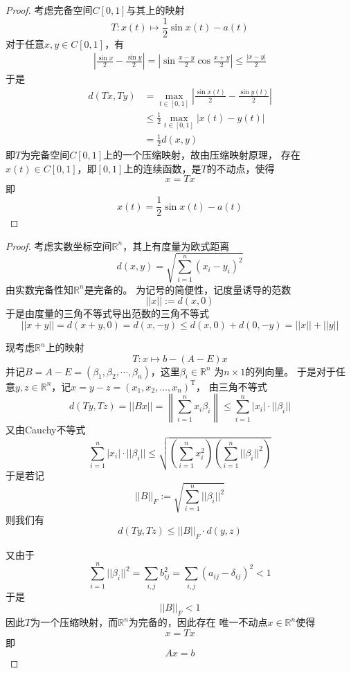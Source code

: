 \documentclass[cn]{homework}
\begin{document}
    \problem
    \begin{proof}
        考虑完备空间$C[0,1]$与其上的映射
        \[T:x(t)\mapsto\frac{1}{2}\sin x(t)-a(t)\]
        对于任意$x,y\in C[0,1]$，有
        \[\begin{aligned}
            \left|\frac{\sin x}{2}-\frac{\sin y}{2}\right|
            =\left|\sin\frac{x-y}{2}\cos\frac{x+y}{2}\right|
            \leq\frac{|x-y|}{2}
        \end{aligned}\]
        于是
        \[\begin{aligned}
        d(Tx,Ty)&=\max_{t\in[0,1]}\left|\frac{\sin x(t)}{2}-\frac{\sin y(t)}{2}\right|\\
        &\leq\frac{1}{2}\max_{t\in[0,1]}|x(t)-y(t)|\\
        &=\frac{1}{2}d(x,y)
        \end{aligned}\]
        即$T$为完备空间$C[0,1]$上的一个压缩映射，故由压缩映射原理，
        存在$x(t)\in C[0,1]$，即$[0,1]$上的连续函数，是$T$的不动点，使得
        \[x=Tx\]
        即
        \[x(t)=\frac{1}{2}\sin x(t)-a(t)\]
    \end{proof}

    \problem
    \begin{proof}
        考虑实数坐标空间$\mathbb R^n$，其上有度量为欧式距离
        \[d(x,y)=\sqrt{\sum_{i=1}^n(x_i-y_i)^2}\]
        由实数完备性知$\mathbb R^n$是完备的。
        为记号的简便性，记度量诱导的范数
        \[||x||:=d(x,0)\]
        于是由度量的三角不等式导出范数的三角不等式
        \[||x+y||=d(x+y,0)=d(x,-y)\leq d(x,0)+d(0,-y)=||x||+||y||\]

        现考虑$\mathbb R^n$上的映射
        \[T:x\mapsto b-(A-E)x\]
        并记$B=A-E=(\beta_1,\beta_2,\cdots,\beta_n)$，这里$\beta_i\in\mathbb R^n$
        为$n\times 1$的列向量。
        于是对于任意$y,z\in\mathbb R^n$，记$x=y-z=(x_1,x_2,\ldots,x_n)^\mathrm T$，
        由三角不等式
        \[d(Ty,Tz)=||Bx||=\left\|\sum_{i=1}^nx_i\beta_i\right\|
        \leq\sum_{i=1}^n|x_i|\cdot||\beta_i||\]
        又由Cauchy不等式
        \[\sum_{i=1}^n|x_i|\cdot||\beta_i||
        \leq\sqrt{\left(\sum_{i=1}^nx_i^2\right)\left(\sum_{i=1}^n||\beta_i||^2\right)}\]
        于是若记
        \[||B||_F:=\sqrt{\sum_{i=1}^n||\beta_i||^2}\]
        则我们有
        \[d(Ty,Tz)\leq ||B||_F\cdot d(y,z)\]

        又由于
        \[\sum_{i=1}^n||\beta_i||^2=\sum_{i,j}b_{ij}^2
        =\sum_{i,j}(a_{ij}-\delta_{ij})^2<1\]
        于是
        \[||B||_F<1\]
        因此$T$为一个压缩映射，而$\mathbb R^n$为完备的，因此存在
        唯一不动点$x\in\mathbb R^n$使得
        \[x=Tx\]
        即
        \[Ax=b\]
    \end{proof}
\end{document}
